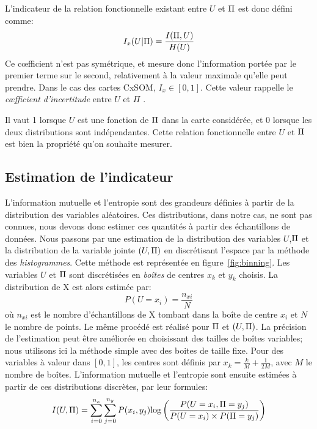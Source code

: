 L'indicateur de la relation fonctionnelle existant entre $U$ et $\Pi$  est donc défini comme:
\begin{equation}
I_x(U|\Pi) = \frac{I(\Pi,U)}{H(U)}
\end{equation}
Ce c\oe{}fficient n'est pas symétrique, et mesure donc l'information portée par le premier terme sur le second, relativement à la valeur maximale qu'elle peut prendre. Dans le cas des cartes CxSOM, $I_x \in [0,1]$. Cette valeur rappelle le \emph{c\oe{}fficient d'incertitude} entre $U$ et $\Pi$ \cite{Theil1961EconomicFA}.

Il vaut 1 lorsque $U$ est une fonction de $\Pi$ dans la carte considérée, et $0$ lorsque les deux distributions sont indépendantes. Cette relation fonctionnelle entre $U$ et $\Pi$ est bien la propriété qu'on souhaite mesurer.

\subsection{Estimation de l'indicateur}

L'information mutuelle et l'entropie sont des grandeurs définies à partir de la distribution des variables aléatoires. Ces distributions, dans notre cas, ne sont pas connues, nous devons donc estimer ces quantités à partir des échantillons de données.
Nous passons par une estimation de la distribution des variables $U$,$\Pi$ et la distribution de la variable jointe $(U,\Pi)$ en discrétisant l'espace par la méthode des \emph{histogrammes}.
Cette méthode est représentée en figure~\ref{fig:binning}. Les variables $U$ et $\Pi$ sont discrétisées en \emph{boîtes} de centres $x_k$ et $y_k$ choisis.
La distribution de X est alors estimée par: 
$$P(U = x_i) = \frac{n_{xi}}{N} $$ où $n_{xi}$ est le nombre d'échantillons de X tombant dans la boîte de centre $x_i$ et $N$ le nombre de points. Le même procédé est réalisé pour $\Pi$ et $(U,\Pi)$. La précision de l'estimation peut être améliorée en choisissant des tailles de boîtes variables; nous utilisons ici la méthode simple avec des boites de taille fixe. Pour des variables à valeur dans $[0,1]$, les centres sont définis par $x_k = \frac{k}{M}+\frac{1}{2M}$, avec $M$ le nombre de boîtes.
L'information mutuelle et l'entropie sont ensuite estimées à partir de ces distributions discrètes, par leur formules:
\begin{equation}
    I(U,\Pi) = \sum_{i = 0}^{n_x} \sum_{j=0}^{n_y} {P(x_i,y_j)\textrm{log}\left(\frac{P(U = x_i,\Pi = y_j)}{P(U = x_i)\times P(\Pi = y_j)}\right)}
   \end{equation}

